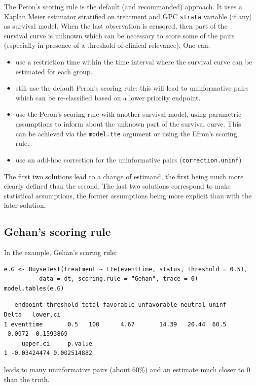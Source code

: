 \documentclass[12pt]{article}
\begin{document}
The Peron's scoring rule is the default (and recommanded) approach. It
uses a Kaplan Meier estimator stratified on treatment and GPC \texttt{strata}
variable (if any) as survival model. When the last observation is
censored, then part of the survival curve is unknown which can be
necessary to score some of the pairs (especially in presence of a
threshold of clinical relevance). One can:
\begin{itemize}
\item use a restriction time within the time interval where the survival
curve can be estimated for each group.
\item still use the default Peron's scoring rule: this will lead to
uninformative pairs which can be re-classified based on a lower
priority endpoint.
\item use the Peron's scoring rule with another survival model, using
parametric assumptions to inform about the unknown part of the
survival curve. This can be achieved via the \texttt{model.tte} argument or
using the Efron's scoring rule.
\item use an add-hoc correction for the uninformative pairs
(\texttt{correction.uninf})
\end{itemize}

The first two solutions lead to a change of estimand, the first being
much more clearly defined than the second. The last two solutions
correspond to make statistical assumptions, the former assumptions
being more explicit than with the later solution.

\subsection{Gehan's scoring rule}
\label{sec:org099da7c}
In the example, Gehan's scoring rule:
\lstset{language=r,label= ,caption= ,captionpos=b,numbers=none}
\begin{lstlisting}
e.G <- BuyseTest(treatment ~ tte(eventtime, status, threshold = 0.5),
          data = dt, scoring.rule = "Gehan", trace = 0)
model.tables(e.G)
\end{lstlisting}

\begin{verbatim}
   endpoint threshold total favorable unfavorable neutral uninf   Delta   lower.ci
1 eventtime       0.5   100      4.67       14.39   20.44  60.5 -0.0972 -0.1593869
     upper.ci     p.value
1 -0.03424474 0.002514882
\end{verbatim}


leads to many uninformative pairs (about 60\%) and an estimate much
closer to 0 than the truth.
\end{document}
